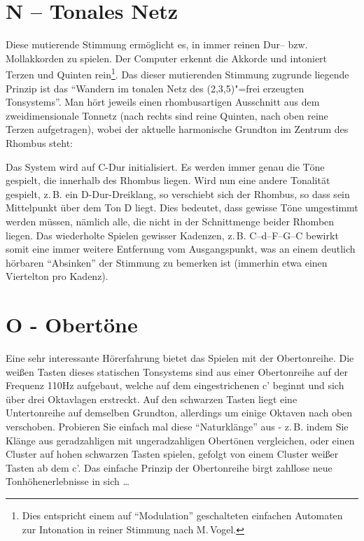 \section{N -- Tonales Netz}\label{sec:n-tonales-netz}
Diese mutierende Stimmung ermöglicht es, in immer reinen Dur-- bzw. 
Mollakkorden zu spielen. Der Computer erkennt die Akkorde und 
intoniert Terzen und Quinten rein\footnote{Dies entspricht einem auf 
"`Modulation"' geschalteten einfachen Automaten zur Intonation in reiner 
Stimmung nach M.\,Vogel.}. Das dieser mutierenden Stimmung 
zugrunde liegende Prinzip ist das "`Wandern im tonalen Netz 
des (2,3,5)"=frei erzeugten Tonsystems"'. Man hört jeweils einen 
rhombusartigen Ausschnitt aus dem zweidimensionale Tonnetz (nach rechts 
sind reine Quinten, nach oben reine Terzen aufgetragen), wobei der 
aktuelle harmonische Grundton im Zentrum des Rhombus steht:



Das System wird auf C-Dur initialisiert. Es werden immer genau die 
Töne gespielt, die innerhalb des Rhombus liegen. Wird nun eine andere 
Tonalität gespielt, z.\,B. ein D-Dur-Dreiklang, so verschiebt sich der 
Rhombus, so dass sein Mittelpunkt über dem Ton D liegt. Dies bedeutet, dass 
gewisse Töne umgestimmt werden müssen, nämlich alle, die nicht in der 
Schnittmenge beider Rhomben liegen. Das wiederholte Spielen gewisser 
Kadenzen, z.\,B. C--d--F--G--C bewirkt somit eine immer weitere 
Entfernung vom Ausgangspunkt, was an einem deutlich hörbaren 
"`Absinken"' der Stimmung zu bemerken ist (immerhin etwa 
einen Viertelton pro Kadenz).

\section{O - Obertöne}\label{sec:o-obertone}
Eine sehr interessante Hörerfahrung bietet das Spielen mit der
Obertonreihe. Die weißen Tasten dieses statischen Tonsystems sind aus
einer Obertonreihe auf der Frequenz 110Hz aufgebaut, welche auf dem
eingestrichenen c' beginnt und sich über drei Oktavlagen erstreckt.
Auf den schwarzen Tasten liegt eine Untertonreihe auf demselben
Grundton, allerdings um einige Oktaven nach oben verschoben. Probieren
Sie einfach mal diese "`Naturklänge"' aus - z.\,B. indem Sie Klänge aus
geradzahligen mit ungeradzahligen Obertönen vergleichen, oder einen
Cluster auf hohen schwarzen Tasten spielen, gefolgt von einem Cluster
weißer Tasten ab dem c'. Das einfache Prinzip der Obertonreihe birgt
zahllose neue Tonhöhenerlebnisse in sich \ldots

